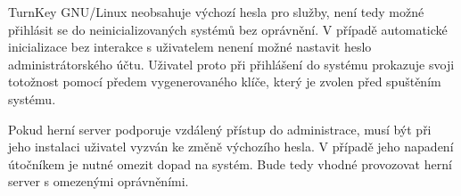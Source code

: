 TurnKey GNU/Linux
neobsahuje výchozí hesla pro služby, není tedy možné přihlásit se do neinicializovaných systémů bez oprávnění.
V případě automatické inicializace bez interakce s uživatelem nenení možné nastavit heslo administrátorského účtu.
Uživatel proto při přihlášení do systému prokazuje svoji totožnost pomocí předem vygenerovaného klíče, který
je zvolen před spuštěním systému. 

Pokud herní server podporuje vzdálený přístup do administrace, musí být při jeho instalaci uživatel vyzván ke změně výchozího hesla.
V případě jeho napadení útočníkem je nutné omezit dopad na systém. Bude tedy vhodné provozovat herní server s omezenými oprávněními. 

